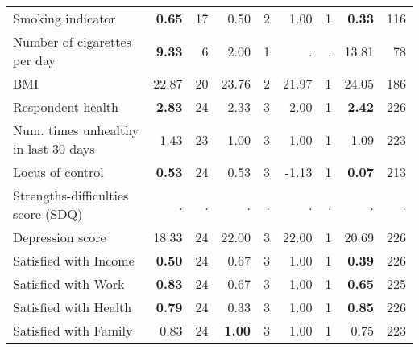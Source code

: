 \begin{tabular}{l r r r r r r r r}
Smoking indicator & \textbf{     0.65} &        17 &      0.50 &         2 &      1.00 &         1 & \textbf{     0.33} &       116 \\
Number of cigarettes per day & \textbf{     9.33} &         6 &      2.00 &         1 &         . & . &     13.81 &        78 \\
BMI &     22.87 &        20 &     23.76 &         2 &     21.97 &         1 &     24.05 &       186 \\
Respondent health & \textbf{     2.83} &        24 &      2.33 &         3 &      2.00 &         1 & \textbf{     2.42} &       226 \\
Num. times unhealthy in last 30 days &      1.43 &        23 &      1.00 &         3 &      1.00 &         1 &      1.09 &       223 \\
Locus of control & \textbf{     0.53} &        24 &      0.53 &         3 &     -1.13 &         1 & \textbf{     0.07} &       213 \\
Strengths-difficulties score (SDQ) &         . & . &         . & . &         . & . &         . & . \\
Depression score &     18.33 &        24 &     22.00 &         3 &     22.00 &         1 &     20.69 &       226 \\
Satisfied with Income & \textbf{     0.50} &        24 &      0.67 &         3 &      1.00 &         1 & \textbf{     0.39} &       226 \\
Satisfied with Work & \textbf{     0.83} &        24 &      0.67 &         3 &      1.00 &         1 & \textbf{     0.65} &       225 \\
Satisfied with Health & \textbf{     0.79} &        24 &      0.33 &         3 &      1.00 &         1 & \textbf{     0.85} &       226 \\
Satisfied with Family &      0.83 &        24 & \textbf{     1.00} &         3 &      1.00 &         1 &      0.75 &       223 \\
\bottomrule
\end{tabular}
